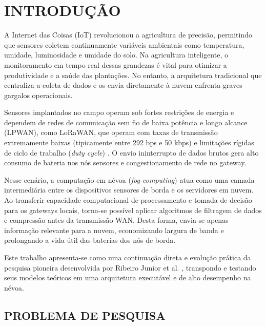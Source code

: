 \documentclass[
	12pt,
	openright,
	oneside,
	a4paper,
	english,
	brazil
	]{abntex2}
\begin{document}
\tableofcontents*
\cleardoublepage

\textual

\chapter{INTRODUÇÃO}

A Internet das Coisas (IoT) revolucionou a agricultura de precisão, permitindo que sensores coletem continuamente variáveis ambientais como temperatura, umidade, luminosidade e umidade do solo. Na agricultura inteligente, o monitoramento em tempo real dessas grandezas é vital para otimizar a produtividade e a saúde das plantações. No entanto, a arquitetura tradicional que centraliza a coleta de dados e os envia diretamente à nuvem enfrenta graves gargalos operacionais.

Sensores implantados no campo operam sob fortes restrições de energia e dependem de redes de comunicação sem fio de baixa potência e longo alcance (LPWAN), como LoRaWAN, que operam com taxas de transmissão extremamente baixas (tipicamente entre 292 bps e 50 kbps) e limitações rígidas de ciclo de trabalho (\textit{duty cycle}) \cite{adelantado2017lorawan}. O envio ininterrupto de dados brutos gera alto consumo de bateria nos nós sensores e congestionamento de rede no gateway.

Nesse cenário, a computação em névoa (\textit{fog computing}) atua como uma camada intermediária entre os dispositivos sensores de borda e os servidores em nuvem. Ao transferir capacidade computacional de processamento e tomada de decisão para os gateways locais, torna-se possível aplicar algoritmos de filtragem de dados e compressão antes da transmissão WAN. Desta forma, envia-se apenas informação relevante para a nuvem, economizando largura de banda e prolongando a vida útil das baterias dos nós de borda.

Este trabalho apresenta-se como uma continuação direta e evolução prática da pesquisa pioneira desenvolvida por Ribeiro Junior et al. \cite{ribeiro2020nearest}, transpondo e testando seus modelos teóricos em uma arquitetura executável e de alto desempenho na névoa.

\section{PROBLEMA DE PESQUISA}
\end{document}
